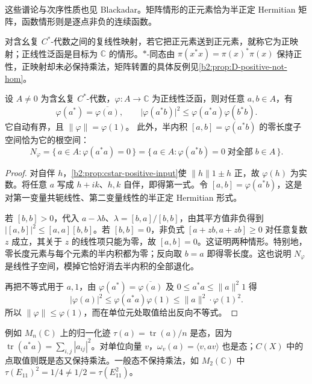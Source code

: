 这些谱论与次序性质也见 Blackadar\cite[Propositions II.3.1.2--II.3.1.3; Corollary II.3.1.5; II.3.1.8]{Blackadar2017OperatorAlgebrasCorrected}。矩阵情形的正元素恰为半正定 Hermitian 矩阵，函数情形则是逐点非负的连续函数。

\ProseParagraphBreak
对含幺复 \(C^*\)-代数之间的复线性映射，若它把正元素送到正元素，就称它为正映射；正线性泛函是目标为 \(\mathbb C\) 的情形。\(*\)-同态由 \(\pi(x^*x)=\pi(x)^*\pi(x)\) 保持正性，正映射却未必保持乘法，矩阵转置的具体反例见\cref{b2:prop:D-positive-not-hom}。

\begin{lemma}\label{b2:lem:positive-functional-cs}
	设 \(A\ne0\) 为含幺复 \(C^*\)-代数，\(\varphi:A\rightarrow\mathbb C\) 为正线性泛函，则对任意 \(a,b\in A\)，有
	\[
		\varphi(a^*)=\overline{\varphi(a)},\qquad \bigl|\varphi(a^*b)\bigr|^2\le\varphi(a^*a)\varphi(b^*b).
	\]
	它自动有界，且 \(\|\varphi\|=\varphi(1)\)。 此外，半内积 \([a,b]=\varphi(a^*b)\) 的零长度子空间恰为它的根空间：
	\[
		N_\varphi=\{\,a\in A:\varphi(a^*a)=0\,\} =\{\,a\in A:\varphi(a^*b)=0\;\text{对全部}\;b\in A\,\}.
	\]
\end{lemma}
\begin{proof}
	对自伴 \(h\)，\cref{b2:prop:cstar-positive-input}使 \(\|h\|1\pm h\) 正，故 \(\varphi(h)\) 为实数。将任意 \(a\) 写成 \(h+ik\)、\(h,k\) 自伴，即得第一式。令 \([a,b]=\varphi(a^*b)\)，这是对第一变量共轭线性、第二变量线性的半正定 Hermitian 形式。

	若 \([b,b]>0\)，代入 \(a-\lambda b\)、\(\lambda=[b,a]/[b,b]\)，由其平方值非负得到 \(\bigl|[a,b]\bigr|^2\le[a,a][b,b]\)。若 \([b,b]=0\)，非负式 \([a+zb,a+zb]\ge0\) 对任意复数 \(z\) 成立，其关于 \(z\) 的线性项只能为零，故 \([a,b]=0\)。这证明两种情形。特别地，零长度元素与每个元素的半内积都为零；反向取 \(b=a\) 即得零长度。这也说明 \(N_\varphi\) 是线性子空间，模掉它恰好消去半内积的全部退化。

	再把不等式用于 \(a,1\)，由 \(\varphi(a^*)=\overline{\varphi(a)}\) 及 \(0\le a^*a\le\|a\|^2 1\) 得
	\[
		\bigl|\varphi(a)\bigr|^2\le\varphi(a^*a)\varphi(1) \le\|a\|^2\cdot\varphi(1)^2.
	\]
	所以 \(\|\varphi\|\le\varphi(1)\)，而在单位元处取值给出反向不等式。
\end{proof}

例如 \(M_n(\mathbb C)\) 上的归一化迹 \(\tau(a)=\operatorname{tr}(a)/n\) 是态，因为 \(\operatorname{tr}(a^*a)=\sum_{i,j}|a_{ij}|^2\)。对单位向量 \(v\)，\(\omega_v(a)=\langle v,av\rangle\) 也是态；\(C(X)\) 中的点取值则既是态又保持乘法。一般态不保持乘法，如 \(M_2(\mathbb C)\) 中 \(\tau(E_{11})^2=1/4\ne1/2=\tau(E_{11}^2)\)。

